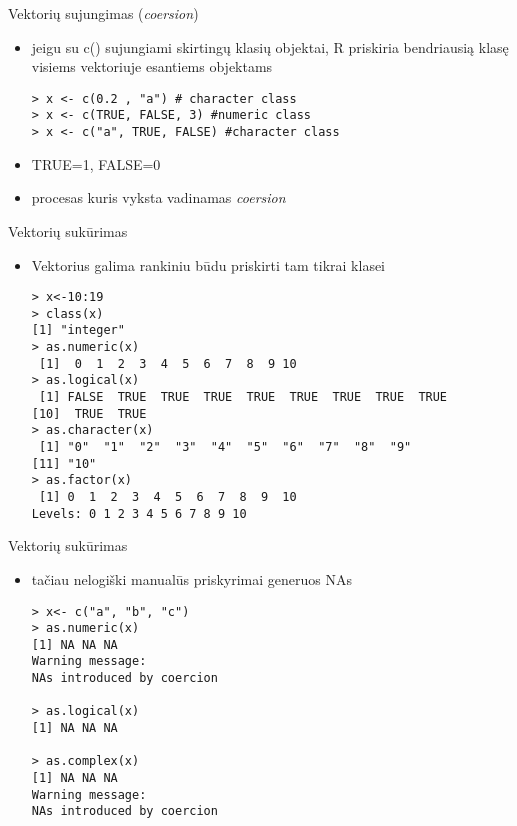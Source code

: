 \documentclass[11pt,xcolor=table]{beamer}
\begin{document}

\begin{frame}[fragile]{Vektorių sujungimas (\textit{coersion})}
\begin{itemize}
\item jeigu su c() sujungiami skirtingų klasių objektai, R priskiria bendriausią klasę visiems vektoriuje esantiems objektams
\begin{lstlisting}
> x <- c(0.2 , "a") # character class
> x <- c(TRUE, FALSE, 3) #numeric class
> x <- c("a", TRUE, FALSE) #character class
\end{lstlisting}
\item TRUE=1, FALSE=0
\item procesas kuris vyksta vadinamas \textit{coersion}
\end{itemize}
\end{frame}


\begin{frame}[fragile]{Vektorių sukūrimas}
\begin{itemize}
\item Vektorius galima rankiniu būdu priskirti tam tikrai klasei 
\begin{lstlisting}
> x<-10:19
> class(x)
[1] "integer"
> as.numeric(x)
 [1]  0  1  2  3  4  5  6  7  8  9 10
> as.logical(x)
 [1] FALSE  TRUE  TRUE  TRUE  TRUE  TRUE  TRUE  TRUE  TRUE
[10]  TRUE  TRUE
> as.character(x)
 [1] "0"  "1"  "2"  "3"  "4"  "5"  "6"  "7"  "8"  "9" 
[11] "10"
> as.factor(x)
 [1] 0  1  2  3  4  5  6  7  8  9  10
Levels: 0 1 2 3 4 5 6 7 8 9 10
\end{lstlisting}
\end{itemize}
\end{frame}


\begin{frame}[fragile]{Vektorių sukūrimas}
\begin{itemize}
\item tačiau nelogiški manualūs priskyrimai generuos NAs
\begin{lstlisting}
> x<- c("a", "b", "c")
> as.numeric(x)
[1] NA NA NA
Warning message:
NAs introduced by coercion 

> as.logical(x)
[1] NA NA NA

> as.complex(x)
[1] NA NA NA
Warning message:
NAs introduced by coercion 
\end{lstlisting}
\end{itemize}
\end{frame}
\end{document}
